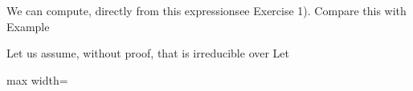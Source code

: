 \documentclass[11pt,oneside]{article}
\begin{document}
\begin{BookBody}
\noindent We can compute, directly from this expressionsee Exercise 1). Compare this with Example \BookEnd{\blacktriangle}

Let us assume, without proof, that  is irreducible over  Let

\begin{center}\begin{adjustbox}{max width=\linewidth}\end{adjustbox}\end{center}

\end{BookBody}

\BookNarrativetrue
\end{document}
